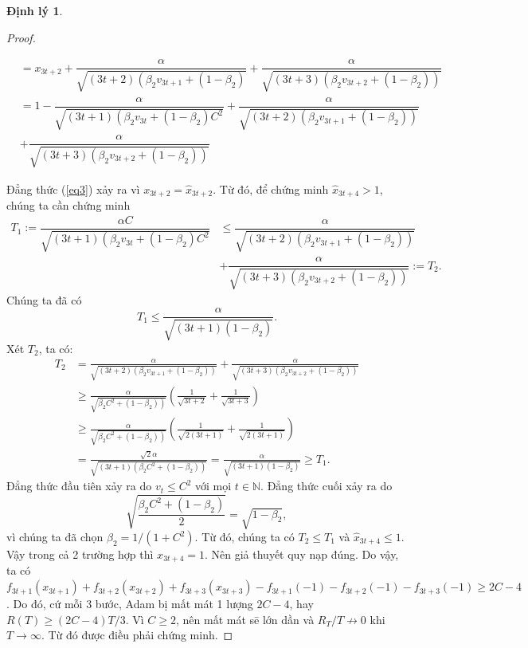 \documentclass[11pt,oneside,a4paper]{report}
\theoremstyle{definition}
\newtheorem{dl}{Định lý}[section]
\begin{document}
\begin{dl}
\begin{proof}
\begin{enumerate}
\begin{align}
&=x_{3 t+2}+\dfrac{\alpha}{\sqrt{(3 t+2)\left(\beta_2 v_{3 t+1}+\left(1-\beta_2\right)\right.}}+\dfrac{\alpha}{\sqrt{(3 t+3)\left(\beta_2 v_{3 t+2}+\left(1-\beta_2\right)\right)}} \nonumber\\
&=1-\dfrac{\alpha}{\sqrt{(3 t+1)\left(\beta_2 v_{3 t}+\left(1-\beta_2\right) C^2\right.}}+\dfrac{\alpha}{\sqrt{(3 t+2)\left(\beta_2 v_{3 t+1}+\left(1-\beta_2\right)\right)}} \label{eq3}\\
&+\dfrac{\alpha}{\sqrt{(3 t+3)\left(\beta_2 v_{3 t+2}+\left(1-\beta_2\right)\right)}} \nonumber
\end{align}
\end{enumerate}
Đẳng thức (\ref{eq3}) xảy ra vì $x_{3 t+2}=\hat{x}_{3 t+2}$. Từ đó, để chứng minh $\hat{x}_{3 t+4}>1$, chúng ta cần chứng minh
\begin{align*}
T_1:=\dfrac{\alpha C}{\sqrt{(3 t+1)\left(\beta_2 v_{3 t}+\left(1-\beta_2\right) C^2\right.}} &\leq \dfrac{\alpha}{\sqrt{(3 t+2)\left(\beta_2 v_{3 t+1}+\left(1-\beta_2\right)\right)}} \\
& +\dfrac{\alpha}{\sqrt{(3 t+3)\left(\beta_2 v_{3 t+2}+\left(1-\beta_2\right)\right)}}:=T_2.
\end{align*}
Chúng ta đã có
$$
T_1 \leq \dfrac{\alpha}{\sqrt{(3 t+1)\left(1-\beta_2\right)}}.
$$
Xét $T_2$, ta có:
$$
\begin{aligned}
T_2 &=\frac{\alpha}{\sqrt{(3 t+2)\left(\beta_2 v_{3 t+1}+\left(1-\beta_2\right)\right)}}+\frac{\alpha}{\sqrt{(3 t+3)\left(\beta_2 v_{3 t+2}+\left(1-\beta_2\right)\right)}} \\
& \geq \frac{\alpha}{\sqrt{\left.\beta_2 C^2+\left(1-\beta_2\right)\right)}}\left(\frac{1}{\sqrt{3 t+2}}+\frac{1}{\sqrt{3 t+3}}\right) \\
& \geq \frac{\alpha}{\sqrt{\left.\beta_2 C^2+\left(1-\beta_2\right)\right)}}\left(\frac{1}{\sqrt{2(3 t+1)}}+\frac{1}{\sqrt{2(3 t+1)}}\right) \\
&=\frac{\sqrt{2} \alpha}{\sqrt{(3 t+1)\left(\beta_2 C^2+\left(1-\beta_2\right)\right)}}=\frac{\alpha}{\sqrt{(3 t+1)\left(1-\beta_2\right)}} \geq T_1.
\end{aligned}
$$
Đẳng thức đầu tiên xảy ra do $v_t \leq C^2$ với mọi $t \in \mathbb{N}$. Đẳng thức cuối xảy ra do
$$
\sqrt{\dfrac{\beta_2 C^2+\left(1-\beta_2\right)}{2}}=\sqrt{1-\beta_2},
$$
vì chúng ta đã chọn $\beta_2=1 /\left(1+C^2\right)$. Từ đó, chúng ta có $T_2 \leq T_1$ và $\hat{x}_{3 t+4} \leq 1$.
Vậy trong cả 2 trường hợp thì $x_{3 t+4}=1$. Nên giả thuyết quy nạp đúng. Do vậy, ta có $f_{3 t+1}\left(x_{3 t+1}\right)+f_{3 t+2}\left(x_{3 t+2}\right)+f_{3 t+3}\left(x_{3 t+3}\right)-f_{3 t+1}(-1)-f_{3 t+2}(-1)-f_{3 t+3}(-1) \geq 2 C-4$. Do đó, cứ mỗi 3 bước, Adam bị mất mát 1 lượng $2 C-4$, hay $R(T) \geq(2 C-4) T / 3$. Vì $C \geq 2$, nên mất mát sē lớn dần và $R_T / T \nrightarrow 0$ khi $T \rightarrow \infty$. Từ đó được điều phải chứng minh.
\end{proof}
\end{dl}
\end{document}
